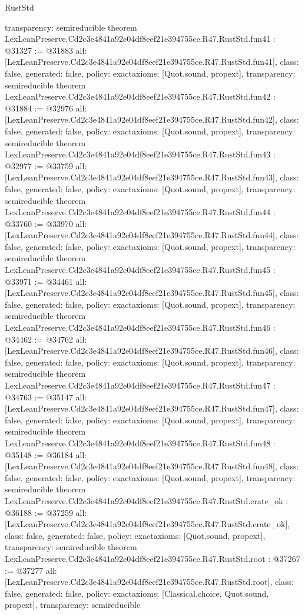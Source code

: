 \begin{lexlean}{RustStd}
\begin{coremodule}
{  transparency: semireducible
}
theorem LexLeanPreserve.Cd2c3e4841a92e04df8eef21e394755ce.R47.RustStd.fun41 : @31327 := @31883 {
  all: [LexLeanPreserve.Cd2c3e4841a92e04df8eef21e394755ce.R47.RustStd.fun41],
  class: false,
  generated: false,
  policy: exact{axioms: [Quot.sound, propext]},
  transparency: semireducible
}
theorem LexLeanPreserve.Cd2c3e4841a92e04df8eef21e394755ce.R47.RustStd.fun42 : @31884 := @32976 {
  all: [LexLeanPreserve.Cd2c3e4841a92e04df8eef21e394755ce.R47.RustStd.fun42],
  class: false,
  generated: false,
  policy: exact{axioms: [Quot.sound, propext]},
  transparency: semireducible
}
theorem LexLeanPreserve.Cd2c3e4841a92e04df8eef21e394755ce.R47.RustStd.fun43 : @32977 := @33759 {
  all: [LexLeanPreserve.Cd2c3e4841a92e04df8eef21e394755ce.R47.RustStd.fun43],
  class: false,
  generated: false,
  policy: exact{axioms: [Quot.sound, propext]},
  transparency: semireducible
}
theorem LexLeanPreserve.Cd2c3e4841a92e04df8eef21e394755ce.R47.RustStd.fun44 : @33760 := @33970 {
  all: [LexLeanPreserve.Cd2c3e4841a92e04df8eef21e394755ce.R47.RustStd.fun44],
  class: false,
  generated: false,
  policy: exact{axioms: [Quot.sound, propext]},
  transparency: semireducible
}
theorem LexLeanPreserve.Cd2c3e4841a92e04df8eef21e394755ce.R47.RustStd.fun45 : @33971 := @34461 {
  all: [LexLeanPreserve.Cd2c3e4841a92e04df8eef21e394755ce.R47.RustStd.fun45],
  class: false,
  generated: false,
  policy: exact{axioms: [Quot.sound, propext]},
  transparency: semireducible
}
theorem LexLeanPreserve.Cd2c3e4841a92e04df8eef21e394755ce.R47.RustStd.fun46 : @34462 := @34762 {
  all: [LexLeanPreserve.Cd2c3e4841a92e04df8eef21e394755ce.R47.RustStd.fun46],
  class: false,
  generated: false,
  policy: exact{axioms: [Quot.sound, propext]},
  transparency: semireducible
}
theorem LexLeanPreserve.Cd2c3e4841a92e04df8eef21e394755ce.R47.RustStd.fun47 : @34763 := @35147 {
  all: [LexLeanPreserve.Cd2c3e4841a92e04df8eef21e394755ce.R47.RustStd.fun47],
  class: false,
  generated: false,
  policy: exact{axioms: [Quot.sound, propext]},
  transparency: semireducible
}
theorem LexLeanPreserve.Cd2c3e4841a92e04df8eef21e394755ce.R47.RustStd.fun48 : @35148 := @36184 {
  all: [LexLeanPreserve.Cd2c3e4841a92e04df8eef21e394755ce.R47.RustStd.fun48],
  class: false,
  generated: false,
  policy: exact{axioms: [Quot.sound, propext]},
  transparency: semireducible
}
theorem LexLeanPreserve.Cd2c3e4841a92e04df8eef21e394755ce.R47.RustStd.crate_ok : @36188 := @37259 {
  all: [LexLeanPreserve.Cd2c3e4841a92e04df8eef21e394755ce.R47.RustStd.crate_ok],
  class: false,
  generated: false,
  policy: exact{axioms: [Quot.sound, propext]},
  transparency: semireducible
}
theorem LexLeanPreserve.Cd2c3e4841a92e04df8eef21e394755ce.R47.RustStd.root : @37267 := @37277 {
  all: [LexLeanPreserve.Cd2c3e4841a92e04df8eef21e394755ce.R47.RustStd.root],
  class: false,
  generated: false,
  policy: exact{axioms: [Classical.choice, Quot.sound, propext]},
  transparency: semireducible
}


\end{coremodule}
\end{lexlean}
